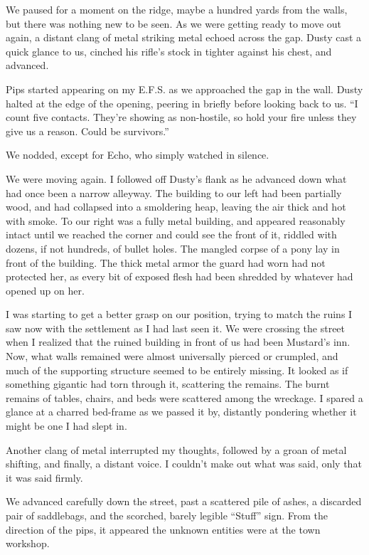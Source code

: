 We paused for a moment on the ridge, maybe a hundred yards from the walls, but there was nothing new to be seen. As we were getting ready to move out again, a distant clang of metal striking metal echoed across the gap. Dusty cast a quick glance to us, cinched his rifle’s stock in tighter against his chest, and advanced.

Pips started appearing on my E.F.S. as we approached the gap in the wall. Dusty halted at the edge of the opening, peering in briefly before looking back to us. “I count five contacts. They’re showing as non-hostile, so hold your fire unless they give us a reason. Could be survivors.”

We nodded, except for Echo, who simply watched in silence.

We were moving again. I followed off Dusty’s flank as he advanced down what had once been a narrow alleyway. The building to our left had been partially wood, and had collapsed into a smoldering heap, leaving the air thick and hot with smoke. To our right was a fully metal building, and appeared reasonably intact until we reached the corner and could see the front of it, riddled with dozens, if not hundreds, of bullet holes. The mangled corpse of a pony lay in front of the building. The thick metal armor the guard had worn had not protected her, as every bit of exposed flesh had been shredded by whatever had opened up on her.

I was starting to get a better grasp on our position, trying to match the ruins I saw now with the settlement as I had last seen it. We were crossing the street when I realized that the ruined building in front of us had been Mustard’s inn. Now, what walls remained were almost universally pierced or crumpled, and much of the supporting structure seemed to be entirely missing. It looked as if something gigantic had torn through it, scattering the remains. The burnt remains of tables, chairs, and beds were scattered among the wreckage. I spared a glance at a charred bed-frame as we passed it by, distantly pondering whether it might be one I had slept in.

Another clang of metal interrupted my thoughts, followed by a groan of metal shifting, and finally, a distant voice. I couldn’t make out what was said, only that it was said firmly.

We advanced carefully down the street, past a scattered pile of ashes, a discarded pair of saddlebags, and the scorched, barely legible “Stuff” sign. From the direction of the pips, it appeared the unknown entities were at the town workshop.

